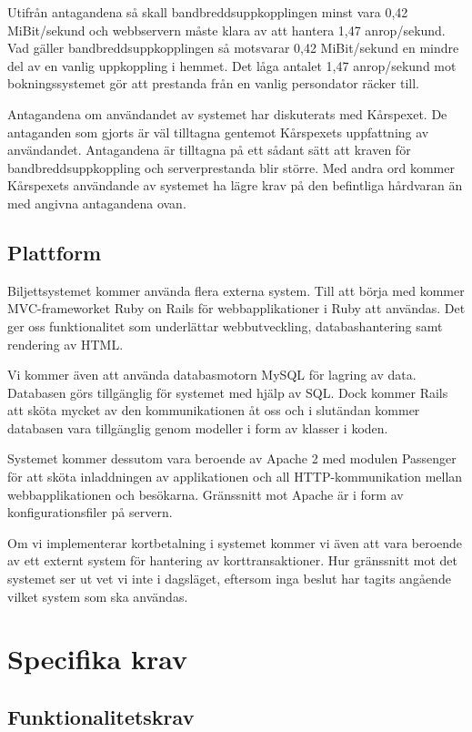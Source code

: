 \documentclass[a4paper, twoside, 11pt, titlepage]{article}
\begin{document}
	Utifrån antagandena så skall bandbreddsuppkopplingen minst vara 0,42 MiBit/sekund och webbservern måste klara av att hantera 1,47 anrop/sekund. Vad gäller bandbreddsuppkopplingen så motsvarar 0,42 MiBit/sekund en mindre del av en vanlig uppkoppling i hemmet. Det låga antalet 1,47 anrop/sekund mot bokningssystemet gör att prestanda från en vanlig persondator räcker till.

	Antagandena om användandet av systemet har diskuterats med Kårspexet. De antaganden som gjorts är väl tilltagna gentemot Kårspexets uppfattning av användandet. Antagandena är tilltagna på ett sådant sätt att kraven för bandbreddsuppkoppling och serverprestanda blir större. Med andra ord kommer Kårspexets användande av systemet ha lägre krav på den befintliga hårdvaran än med angivna antagandena ovan.

	\subsection{Plattform}


	Biljettsystemet kommer använda flera externa system. Till att börja med kommer MVC-frameworket Ruby on Rails för webbapplikationer i Ruby att användas. Det ger oss funktionalitet som underlättar webbutveckling, databashantering samt rendering av HTML.

	Vi kommer även att använda databasmotorn MySQL för lagring av data. Databasen görs tillgänglig för systemet med hjälp av SQL. Dock kommer Rails att sköta mycket av den kommunikationen åt oss och i slutändan kommer databasen vara tillgänglig genom modeller i form av klasser i koden. 

	Systemet kommer dessutom vara beroende av Apache 2 med modulen Passenger för att sköta inladdningen av applikationen och all HTTP-kommunikation mellan webbapplikationen och besökarna. Gränssnitt mot Apache är i form av konfigurationsfiler på servern. 

	Om vi implementerar kortbetalning i systemet kommer vi även att vara beroende av ett externt system för hantering av korttransaktioner. Hur gränssnitt mot det systemet ser ut vet vi inte i dagsläget, eftersom inga beslut har tagits angående vilket system som ska användas.

\clearpage
\section{Specifika krav}



	\subsection{Funktionalitetskrav}
\end{document}
